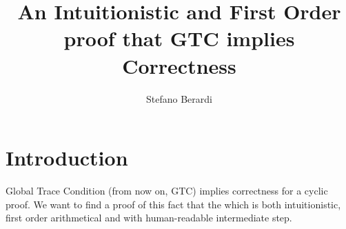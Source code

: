 \documentclass{lmcs}
\begin{document}
\sloppy 
{}


\newcommand{\size} 		                  {{\tt s}}
\newcommand{\state} 		               {{\tt S}}
\newcommand{\minStable}             {{\tt m}}
\newcommand{\unfold}                   {{\tt u}}
\newcommand{\height}                    {{\tt h}}
\newcommand{\setF} 		                   {{\mathcal F}}
\newcommand{\setU} 	                   {{\mathcal U}}
\newcommand{\cons}                       {{\tt cons}}
\newcommand{\newton} [2]             {{\genfrac(){0pt}{1} {#1}{#2}}}
\newcommand{\questionMarks} [1] {{‘‘#1’’}}
\newcommand{\DomCard}               {{\tt DomCard}}

\title{An Intuitionistic and First Order proof that GTC implies Correctness}
\date{}

\author[S. Berardi]{Stefano Berardi}
\address{Universit\`{a} di Torino,
Torino, Italy}




\maketitle

\section{Introduction}
Global Trace Condition (from now on, GTC) implies correctness for a cyclic proof.
We want to find a proof of this fact that the  which is both intuitionistic, 
first order arithmetical and with human-readable intermediate step.  
\end{document}
